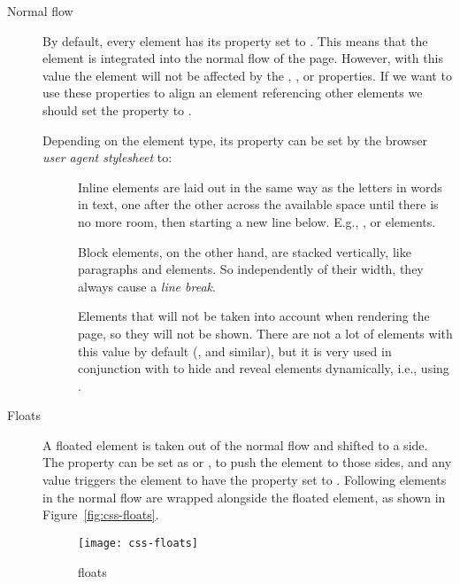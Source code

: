\begin{description}
  \item[Normal flow] By default, every element has its  property set to .
  This means that the element is integrated into the normal flow of the page.
  However, with this value the element will not be affected by the , ,  or  properties.
  If we want to use these properties to align an element referencing other elements we should set the  property to .
  
  Depending on the element type, its  property can be set by the browser \emph{user agent stylesheet} to:
  \begin{description}
      \item[] Inline elements are laid out in the same way as the letters in words in text, one after the other across the available space until there is no more room, then starting a new line below. E.g., ,  or  elements.
    \item[] Block elements, on the other hand, are stacked vertically, like paragraphs and  elements.
    So independently of their width, they always cause a \emph{line break}.
    \item[] Elements that will not be taken into account when rendering the page, so they will not be shown.
    There are not a lot of elements with this value by default (,  and similar), but it is very used in conjunction with  to hide and reveal elements dynamically, i.e., using .
  \end{description}
  \item[Floats] A floated element is taken out of the normal flow and shifted to a side.
  The property  can be set as  or , to push the element to those sides, and any value triggers the element to have the  property set to .
  Following elements in the normal flow are wrapped alongside the floated element, as shown in Figure~\vref{fig:css-floats}.
  \begin{figure}[htbp]
    \centering
      \texttt{[image: css-floats]}
    \caption{ floats}
    \label{fig:css-floats}
  \end{figure}
  

\end{description}
